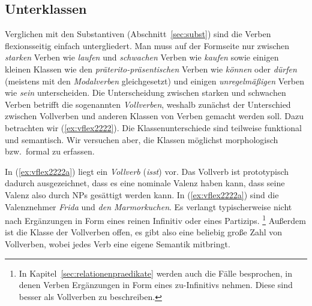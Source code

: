 \subsection{Unterklassen}

\label{sec:vunterklass}


Verglichen mit den Substantiven (Abschnitt~\ref{sec:subst}) sind die Verben flexionsseitig einfach untergliedert.
Man muss auf der Formseite nur zwischen \textit{starken} Verben wie \textit{laufen} und \textit{schwachen} Verben wie \textit{kaufen} sowie einigen kleinen Klassen wie den \textit{präterito-präsentischen} Verben wie \textit{können} oder \textit{dürfen} (meistens mit den \textit{Modalverben} gleichgesetzt) und einigen \textit{unregelmäßigen} Verben wie \textit{sein} unterscheiden.
Die Unterscheidung zwischen starken und schwachen Verben betrifft die sogenannten \textit{Vollverben}, weshalb zunächst der Unterschied zwischen Vollverben und anderen Klassen von Verben gemacht werden soll.
Dazu betrachten wir (\ref{ex:vflex2222}).
Die Klassenunterschiede sind teilweise funktional und semantisch.
Wir versuchen aber, die Klassen möglichst morphologisch bzw.\ formal zu erfassen.

\begin{exe}
  \ex\label{ex:vflex2222}
  \begin{xlist}
  \end{xlist}
\end{exe}

In (\ref{ex:vflex2222a}) liegt ein \textit{Vollverb} (\textit{isst}) vor.
Das Vollverb ist prototypisch dadurch ausgezeichnet, dass es eine nominale Valenz haben kann, dass seine Valenz also durch NPs gesättigt werden kann.
In (\ref{ex:vflex2222a}) sind die Valenznehmer \textit{Frida} und \textit{den Marmorkuchen}.
Es verlangt typischerweise nicht nach Ergänzungen in Form eines reinen Infinitiv oder eines Partizips.%
\footnote{In Kapitel~\ref{sec:relationenpraedikate} werden auch die Fälle besprochen, in denen Verben Ergänzungen in Form eines zu-Infinitivs nehmen.
Diese sind besser als Vollverben zu beschreiben.}
Außerdem ist die Klasse der Vollverben offen, es gibt also eine beliebig große Zahl von Vollverben, wobei jedes Verb eine eigene Semantik mitbringt.

